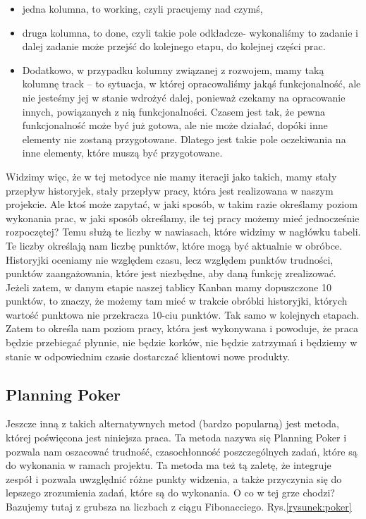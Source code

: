 \begin{itemize}
	\item jedna kolumna, to working, czyli pracujemy nad czymś,
	\item druga kolumna, to done, czyli takie pole odkładcze- wykonaliśmy to zadanie i dalej zadanie może przejść do kolejnego etapu, do kolejnej części prac.
	\item Dodatkowo, w przypadku kolumny związanej z rozwojem, mamy taką kolumnę track – to sytuacja, w której opracowaliśmy jakąś funkcjonalność,
	ale nie jesteśmy jej w stanie wdrożyć dalej, ponieważ czekamy na opracowanie innych, powiązanych z nią funkcjonalności.
	Czasem jest tak, że pewna funkcjonalność może być już gotowa, ale nie może działać, dopóki inne elementy nie zostaną przygotowane.
	Dlatego jest takie pole oczekiwania na inne elementy, które muszą być przygotowane.
\end{itemize}

Widzimy więc, że w tej metodyce nie mamy iteracji jako takich, mamy stały przepływ historyjek, stały przepływ pracy, która jest realizowana w naszym projekcie.
Ale ktoś może zapytać, w jaki sposób, w takim razie określamy poziom wykonania prac, w jaki sposób określamy, ile tej pracy możemy mieć jednocześnie rozpoczętej? 
Temu służą te liczby w nawiasach, które widzimy w nagłówku tabeli. Te liczby określają nam liczbę punktów, które mogą być aktualnie w obróbce.
Historyjki oceniamy nie względem czasu, lecz względem punktów trudności, punktów zaangażowania, które jest niezbędne, aby daną funkcję zrealizować. 
Jeżeli zatem, w danym etapie naszej tablicy Kanban mamy dopuszczone 10 punktów, to znaczy, że możemy tam mieć w trakcie obróbki historyjki,
których wartość punktowa nie przekracza 10-ciu punktów. Tak samo w kolejnych etapach.
Zatem to określa nam poziom pracy, która jest wykonywana i powoduje, że praca będzie przebiegać płynnie,
nie będzie korków, nie będzie zatrzymań i będziemy w stanie w odpowiednim czasie dostarczać klientowi nowe produkty.

\subsection{Planning Poker}

Jeszcze inną z takich alternatywnych metod (bardzo popularną)  jest metoda, której poświęcona jest niniejsza praca.
Ta metoda nazywa się Planning Poker i pozwala nam oszacować trudność,
czasochłonność poszczególnych zadań, które są do wykonania w ramach projektu.
Ta metoda ma też tą zaletę, że integruje zespół i pozwala uwzględnić różne punkty widzenia,
a także przyczynia się do lepszego zrozumienia zadań, które są do wykonania.
O co w tej grze chodzi? Bazujemy tutaj z grubsza na liczbach z ciągu Fibonacciego. Rys.\ref{rysunek:poker}

